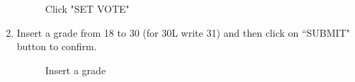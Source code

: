 \documentclass[ManualeUtente]{subfiles}
\begin{document}
\begin{enumerate}
\begin{figure}[H]
		\caption{Click "SET VOTE"}
		\label{fig:Click "SET VOTE"}
	\end{figure}
	\item Insert a grade from 18 to 30 (for 30L write 31) and then click on \textquotedblleft SUBMIT" button to confirm.
	\begin{figure}[H]
		\centering
		\caption{Insert a grade}
		\label{fig:Insert a grade}
	\end{figure}
\end{enumerate}
\end{document}
